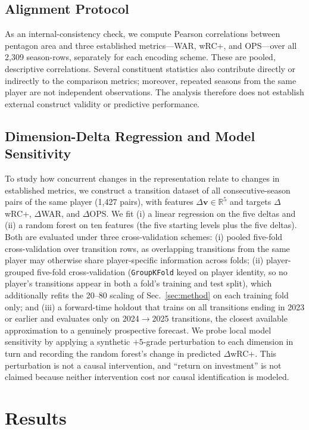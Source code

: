 \documentclass[10pt,twocolumn,letterpaper]{article}
\begin{document}
\subsection{Alignment Protocol}
As an internal-consistency check, we compute Pearson correlations between pentagon area and three established metrics---WAR, wRC+, and OPS---over all 2{,}309 season-rows, separately for each encoding scheme. These are pooled, descriptive correlations. Several constituent statistics also contribute directly or indirectly to the comparison metrics; moreover, repeated seasons from the same player are not independent observations. The analysis therefore does not establish external construct validity or predictive performance.

\subsection{Dimension-Delta Regression and Model Sensitivity}
\label{sec:roi-method}
To study how concurrent changes in the representation relate to changes in established metrics, we construct a transition dataset of all consecutive-season pairs of the same player (1{,}427 pairs), with features $\Delta\mathbf{v} \in \mathbb{R}^5$ and targets $\Delta$wRC+, $\Delta$WAR, and $\Delta$OPS. We fit (i) a linear regression on the five deltas and (ii) a random forest on ten features (the five starting levels plus the five deltas). Both are evaluated under three cross-validation schemes: (i) pooled five-fold cross-validation over transition rows, as overlapping transitions from the same player may otherwise share player-specific information across folds; (ii) player-grouped five-fold cross-validation (\texttt{GroupKFold} keyed on player identity, so no player's transitions appear in both a fold's training and test split), which additionally refits the 20--80 scaling of Sec.~\ref{sec:method} on each training fold only; and (iii) a forward-time holdout that trains on all transitions ending in 2023 or earlier and evaluates only on 2024$\to$2025 transitions, the closest available approximation to a genuinely prospective forecast. We probe local model sensitivity by applying a synthetic $+5$-grade perturbation to each dimension in turn and recording the random forest's change in predicted $\Delta$wRC+. This perturbation is not a causal intervention, and ``return on investment'' is not claimed because neither intervention cost nor causal identification is modeled.

\section{Results}
\label{sec:results}
\end{document}
